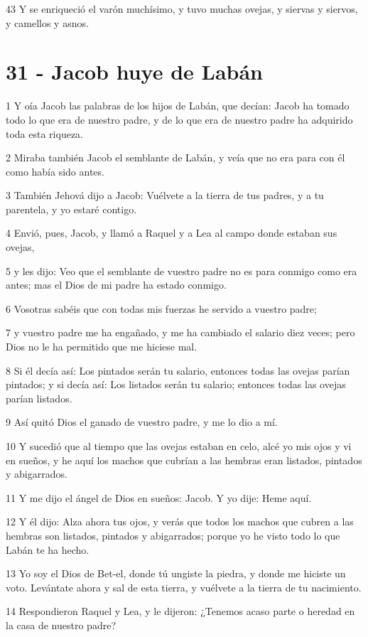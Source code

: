 43 Y se enriqueció el varón muchísimo, y tuvo muchas ovejas, y siervas y siervos, y camellos y asnos.

\chapter{31 - Jacob huye de Labán}

1 Y oía Jacob las palabras de los hijos de Labán, que decían: Jacob ha tomado todo lo que era de nuestro padre, y de lo que era de nuestro padre ha adquirido toda esta riqueza.

2 Miraba también Jacob el semblante de Labán, y veía que no era para con él como había sido antes.

3 También Jehová dijo a Jacob: Vuélvete a la tierra de tus padres, y a tu parentela, y yo estaré contigo.

4 Envió, pues, Jacob, y llamó a Raquel y a Lea al campo donde estaban sus ovejas,

5 y les dijo: Veo que el semblante de vuestro padre no es para conmigo como era antes; mas el Dios de mi padre ha estado conmigo.

6 Vosotras sabéis que con todas mis fuerzas he servido a vuestro padre;

7 y vuestro padre me ha engañado, y me ha cambiado el salario diez veces; pero Dios no le ha permitido que me hiciese mal.

8 Si él decía así: Los pintados serán tu salario, entonces todas las ovejas parían pintados; y si decía así: Los listados serán tu salario; entonces todas las ovejas parían listados.

9 Así quitó Dios el ganado de vuestro padre, y me lo dio a mí.

10 Y sucedió que al tiempo que las ovejas estaban en celo, alcé yo mis ojos y vi en sueños, y he aquí los machos que cubrían a las hembras eran listados, pintados y abigarrados.

11 Y me dijo el ángel de Dios en sueños: Jacob. Y yo dije: Heme aquí.

12 Y él dijo: Alza ahora tus ojos, y verás que todos los machos que cubren a las hembras son listados, pintados y abigarrados; porque yo he visto todo lo que Labán te ha hecho.

13 Yo soy el Dios de Bet-el, donde tú ungiste la piedra, y donde me hiciste un voto. Levántate ahora y sal de esta tierra, y vuélvete a la tierra de tu nacimiento.

14 Respondieron Raquel y Lea, y le dijeron: ¿Tenemos acaso parte o heredad en la casa de nuestro padre?

